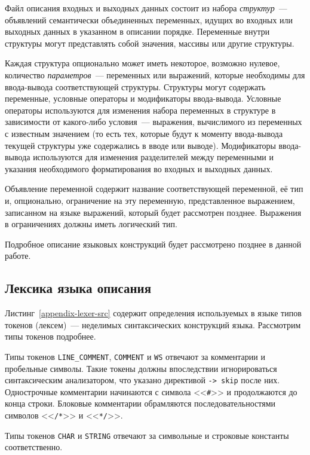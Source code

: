 \documentclass[times,specification,annotation]{style/itmo-student-thesis/itmo-student-thesis}
\begin{document}
Файл описания входных и выходных данных состоит из набора \textit{структур}~--- объявлений семантически объединенных переменных, идущих во входных или выходных данных в указанном в описании порядке. Переменные внутри структуры могут представлять собой значения, массивы или другие структуры.

Каждая структура опционально может иметь некоторое, возможно нулевое, количество \textit{параметров}~--- переменных или выражений, которые необходимы для ввода-вывода соответствующей структуры. Структуры могут содержать переменные, условные операторы и модификаторы ввода-вывода. Условные операторы используются для изменения набора переменных в структуре в зависимости от какого-либо условия~--- выражения, вычислимого из переменных с известным значением (то есть тех, которые будут к моменту ввода-вывода текущей структуры уже содержались в вводе или выводе). Модификаторы ввода-вывода используются для изменения разделителей между переменными и указания необходимого форматирования во входных и выходных данных.

Объявление переменной содержит название соответствующей переменной, её тип и, опционально, ограничение на эту переменную, представленное выражением, записанном на языке выражений, который будет рассмотрен позднее. Выражения в ограничениях должны иметь логический тип.

Подробное описание языковых конструкций будет рассмотрено позднее в данной работе.

\subsection{Лексика языка описания}

Листинг~\ref{appendix-lexer-src} содержит определения используемых в языке типов токенов (лексем)~--- неделимых синтаксических конструкций языка. Рассмотрим типы токенов подробнее.

Типы токенов \texttt{LINE\_COMMENT}, \texttt{COMMENT} и \texttt{WS} отвечают за комментарии и пробельные символы. Такие токены должны впоследствии игнорироваться синтаксическим анализатором, что указано директивой \texttt{-> skip} после них. Однострочные комментарии начинаются с символа <<\texttt{\#}>> и продолжаются до конца строки. Блоковые комментарии обрамляются последовательностями символов <<\texttt{/*}>> и <<\texttt{*/}>>.

Типы токенов \texttt{CHAR} и \texttt{STRING} отвечают за символьные и строковые константы соответственно.
\end{document}
